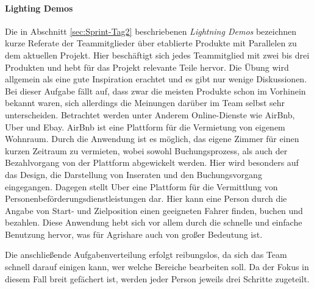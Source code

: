 \paragraph{Lighting Demos}
Die in Abschnitt \ref{sec:Sprint-Tag2} beschriebenen \textit{Lightning Demos} bezeichnen kurze Referate der Teammitglieder über etablierte Produkte mit Parallelen zu dem aktuellen Projekt. 
Hier beschäftigt sich jedes Teammitglied mit zwei bis drei Produkten und hebt für das Projekt relevante Teile hervor. Die Übung wird allgemein als eine gute Inspiration erachtet und es gibt nur wenige Diskussionen. 
Bei dieser Aufgabe fällt auf, dass zwar die meisten Produkte schon im Vorhinein bekannt waren, sich allerdings die Meinungen darüber im Team selbst sehr unterscheiden. Betrachtet werden unter Anderem Online-Dienste wie AirBnb, Uber und Ebay. AirBnb ist eine Plattform für die Vermietung von eigenem Wohnraum. Durch die Anwendung ist es möglich, das eigene Zimmer für einen kurzen Zeitraum zu vermieten, wobei sowohl Buchungsprozess, als auch der Bezahlvorgang von der Plattform abgewickelt werden. Hier wird besonders auf das Design, die Darstellung von Inseraten und den Buchungsvorgang eingegangen. Dagegen stellt Uber eine Plattform für die Vermittlung von Personenbeförderungsdienstleistungen dar. Hier kann eine Person durch die Angabe von Start- und Zielposition einen geeigneten Fahrer finden, buchen und bezahlen. Diese Anwendung hebt sich vor allem durch die schnelle und einfache Benutzung hervor, was für Agrishare auch von großer Bedeutung ist.

Die anschließende Aufgabenverteilung erfolgt reibungslos, da sich das Team schnell darauf einigen kann, wer welche Bereiche bearbeiten soll. Da der Fokus in diesem Fall breit gefächert ist, werden jeder Person jeweils drei Schritte zugeteilt.

